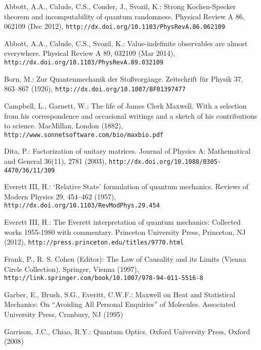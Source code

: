 \documentclass{llncs}
\begin{document}
\begin{thebibliography}{10}
\providecommand{\url}[1]{\texttt{#1}}
\providecommand{\urlprefix}{URL }

Abbott, A.A., Calude, C.S., Conder, J., Svozil, K.: Strong {K}ochen-{S}pecker
  theorem and incomputability of quantum randomness. Physical Review A  86,
  062109 (Dec 2012), \url{http://dx.doi.org/10.1103/PhysRevA.86.062109}

Abbott, A.A., Calude, C.S., Svozil, K.: Value-indefinite observables are almost
  everywhere. Physical Review A  89,  032109 (Mar 2014),
  \url{http://dx.doi.org/10.1103/PhysRevA.89.032109}

Born, M.: Zur {Q}uantenmechanik der {S}to{\ss}vorg{\"{a}}nge. Zeitschrift
  f{\"{u}}r Physik  37,  863--867 (1926),
  \url{http://dx.doi.org/10.1007/BF01397477}

Campbell, L., Garnett, W.: The life of {J}ames {C}lerk {M}axwell. {W}ith a
  selection from his correspondence and occasional writings and a sketch of his
  contributions to science. MacMillan, London (1882),
  \url{http://www.sonnetsoftware.com/bio/maxbio.pdf}

Dita, P.: Factorization of unitary matrices. Journal of Physics A: Mathematical
  and General  36(11),  2781 (2003),
  \url{http://dx.doi.org/10.1088/0305-4470/36/11/309}

{Everett III}, H.: `{R}elative {S}tate' formulation of quantum mechanics.
  Reviews of Modern Physics  29,  454--462 (1957),
  \url{http://dx.doi.org/10.1103/RevModPhys.29.454}

{Everett III}, H.: The {E}verett interpretation of quantum mechanics: Collected
  works 1955-1980 with commentary. Princeton University Press, Princeton, NJ
  (2012), \url{http://press.princeton.edu/titles/9770.html}

Frank, P., {R. S. Cohen (Editor)}: The Law of Causality and its Limits (Vienna
  Circle Collection). Springer, Vienna (1997),
  \url{http://link.springer.com/book/10.1007/978-94-011-5516-8}

Garber, E., Brush, S.G., Everitt, C.W.F.: {M}axwell on Heat and Statistical
  Mechanics: On ``Avoiding All Personal Enquiries'' of Molecules. Associated
  University Press, Cranbury, NJ (1995)

Garrison, J.C., Chiao, R.Y.: Quantum Optics. Oxford University Press, Oxford
  (2008)


\end{thebibliography}
\end{document}
